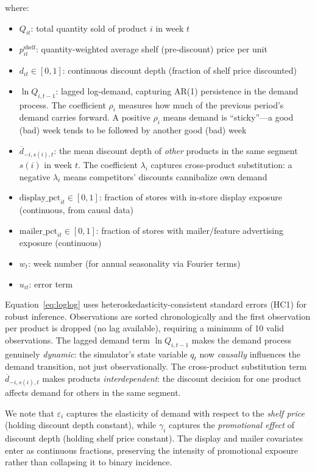 \documentclass[12pt,a4paper]{article}
\begin{document}
where:
\begin{itemize}[nosep]
\item $Q_{it}$: total quantity sold of product $i$ in week $t$
\item $p_{it}^{\text{shelf}}$: quantity-weighted average shelf
(pre-discount) price per unit
\item $d_{it} \in [0, 1]$: continuous discount depth (fraction of
shelf price discounted)
\item $\ln Q_{i,t-1}$: lagged log-demand, capturing AR(1)
persistence in the demand process. The coefficient $\rho_i$
measures how much of the previous period's demand carries forward.
A positive $\rho_i$ means demand is ``sticky''---a good (bad) week
tends to be followed by another good (bad) week
\item $\overline{d}_{-i,s(i),t}$: the mean discount depth of
\emph{other} products in the same segment $s(i)$ in week $t$.
The coefficient $\lambda_i$ captures cross-product substitution:
a negative $\lambda_i$ means competitors' discounts cannibalize
own demand
\item $\text{display\_pct}_{it} \in [0,1]$: fraction of stores with
in-store display exposure (continuous, from causal data)
\item $\text{mailer\_pct}_{it} \in [0,1]$: fraction of stores with
mailer/feature advertising exposure (continuous)
\item $w_t$: week number (for annual seasonality via Fourier terms)
\item $u_{it}$: error term
\end{itemize}

Equation~\eqref{eq:loglog} uses heteroskedasticity-consistent
standard errors (HC1) for robust inference. Observations are sorted
chronologically and the first observation per product is dropped
(no lag available), requiring a minimum of 10 valid observations.
The lagged demand term $\ln Q_{i,t-1}$ makes the demand process
genuinely \emph{dynamic}: the simulator's state variable $q_t$ now
\emph{causally} influences the demand transition, not just
observationally. The cross-product substitution term
$\overline{d}_{-i,s(i),t}$ makes products \emph{interdependent}:
the discount decision for one product affects demand for others in
the same segment.

We note that $\varepsilon_i$ captures the elasticity of demand with
respect to the \emph{shelf price} (holding discount depth constant),
while $\gamma_i$ captures the \emph{promotional effect} of discount
depth (holding shelf price constant). The display and mailer
covariates enter as continuous fractions, preserving the intensity of
promotional exposure rather than collapsing it to binary incidence.
\end{document}
